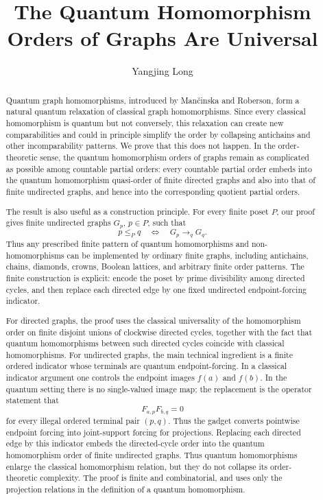 \documentclass[11pt]{amsart}
\title[The Quantum Homomorphism Orders of Graphs Are Universal]{The Quantum Homomorphism Orders of Graphs Are Universal}
\author{Yangjing Long}
\theoremstyle{plain}
\theoremstyle{definition}
\newcommand{\toq}{\to_q}
\begin{document}
\begin{abstract}
Quantum graph homomorphisms, introduced by Man\v{c}inska and Roberson, form a natural quantum relaxation of classical graph homomorphisms.  Since every classical homomorphism is quantum but not conversely, this relaxation can create new comparabilities and could in principle simplify the order by collapsing antichains and other incomparability patterns.  We prove that this does not happen.  In the order-theoretic sense, the quantum homomorphism orders of graphs remain as complicated as possible among countable partial orders: every countable partial order embeds into the quantum homomorphism quasi-order of finite directed graphs and also into that of finite undirected graphs, and hence into the corresponding quotient partial orders.

The result is also useful as a construction principle.  For every finite poset $P$, our proof gives finite undirected graphs $G_p$, $p\in P$, such that
\[
   p\le_P q
   \quad\Longleftrightarrow\quad
   G_p\toq G_q.
\]
Thus any prescribed finite pattern of quantum homomorphisms and non-homomorphisms can be implemented by ordinary finite graphs, including antichains, chains, diamonds, crowns, Boolean lattices, and arbitrary finite order patterns.  The finite construction is explicit: encode the poset by prime divisibility among directed cycles, and then replace each directed edge by one fixed undirected endpoint-forcing indicator.

For directed graphs, the proof uses the classical universality of the homomorphism order on finite disjoint unions of clockwise directed cycles, together with the fact that quantum homomorphisms between such directed cycles coincide with classical homomorphisms.  For undirected graphs, the main technical ingredient is a finite ordered indicator whose terminals are quantum endpoint-forcing.  In a classical indicator argument one controls the endpoint images $f(a)$ and $f(b)$.  In the quantum setting there is no single-valued image map; the replacement is the operator statement that
\[
   F_{a,p}F_{b,q}=0
\]
for every illegal ordered terminal pair $(p,q)$.  Thus the gadget converts pointwise endpoint forcing into joint-support forcing for projections.  Replacing each directed edge by this indicator embeds the directed-cycle order into the quantum homomorphism order of finite undirected graphs.  Thus quantum homomorphisms enlarge the classical homomorphism relation, but they do not collapse its order-theoretic complexity.  The proof is finite and combinatorial, and uses only the projection relations in the definition of a quantum homomorphism.
\end{abstract}
\end{document}
